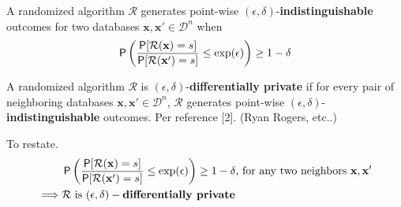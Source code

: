 \documentclass[11pt]{article}
\newcommand{\cR}{\mathcal{R}}
\newcommand{\Dsp}{\mathcal{D}}
\newcommand{\xv}{\mathbf{x}}
\begin{document}
\begin{defn}
A randomized algorithm $\cR$ generates point-wise  $(\epsilon,\delta)$-\textbf{indistinguishable} outcomes for two databases $\xv,\xv' \in \Dsp^n$ when
\begin{equation} \label{eq:dpcnt}
\P \left ( \frac{\P[\cR(\xv) = s]}{\P[\cR(\xv') = s]} \le  \exp(\epsilon) \right ) \ge 1 - \delta
\end{equation}
\end{defn}

\begin{prop} \label{prop:dpcnt}
A randomized algorithm $\cR$ is $(\epsilon,\delta)$-\textbf{differentially private} if for every pair of neighboring databases $\xv,\xv' \in \Dsp^n$, $\cR$ generates point-wise  $(\epsilon,\delta)$-\textbf{indistinguishable} outcomes.   Per reference [2].  (Ryan Rogers, etc..)

To restate.
\begin{align} \label{eq:dpcnt}
 & \P \left ( \frac{\P[\cR(\xv) = s]}{\P[\cR(\xv') = s]} \le  \exp(\epsilon) \right ) \ge 1 - \delta \text{, for any two neighbors } \xv,\xv' \\
\implies & \cR \text{ is } (\epsilon,\delta)-\textbf{differentially private}
\end{align}
\end{prop}
\end{document}
